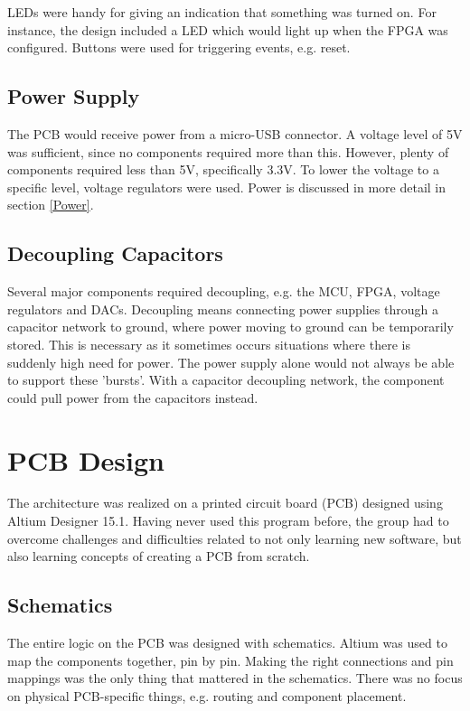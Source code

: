 LEDs were handy for giving an indication that something was turned on. 
For instance, the design included a LED which would light up when the FPGA was configured.
Buttons were used for triggering events, e.g. reset.

\subsection{Power Supply}
The PCB would receive power from a micro-USB connector. 
A voltage level of 5V was sufficient, since no components required more than this. 
However, plenty of components required less than 5V, specifically 3.3V. 
To lower the voltage to a specific level, voltage regulators were used. 
Power is discussed in more detail in section \ref{Power}.

\subsection{Decoupling Capacitors}
Several major components required decoupling, e.g. the MCU, FPGA, voltage regulators and DACs.
Decoupling means connecting power supplies through a capacitor network to ground, where power moving to ground can be temporarily stored.
This is necessary as it sometimes occurs situations where there is suddenly high need for power.
The power supply alone would not always be able to support these 'bursts'.
With a capacitor decoupling network, the component could pull power from the capacitors instead.

\section{PCB Design}
The architecture was realized on a printed circuit board (PCB) designed using Altium Designer 15.1.
Having never used this program before, the group had to overcome challenges and difficulties related to not only learning new software, but also learning concepts of creating a PCB from scratch. 

\subsection{Schematics}
The entire logic on the PCB was designed with schematics. 
Altium was used to map the components together, pin by pin. 
Making the right connections and pin mappings was the only thing that mattered in the schematics. 
There was no focus on physical PCB-specific things, e.g. routing and component placement.

